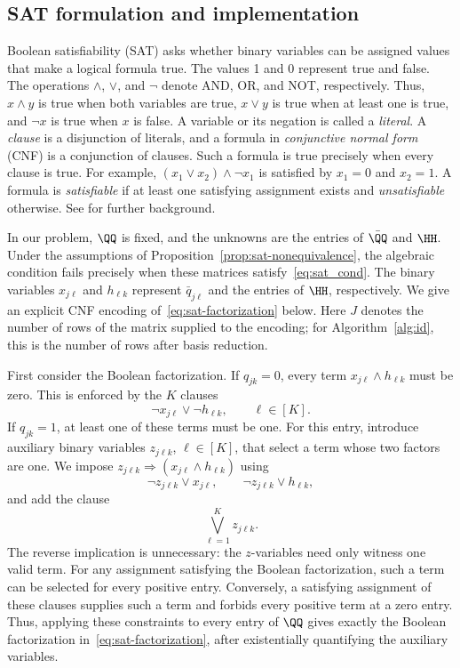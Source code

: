 \subsection{SAT formulation and implementation}
\label{app:sat-primer}

Boolean satisfiability (SAT) asks whether binary variables can be
assigned values that make a logical formula true. The values 1 and 0
represent true and false. The operations $\wedge$, $\vee$, and $\neg$
denote AND, OR, and NOT, respectively. Thus, $x\wedge y$ is true when
both variables are true, $x\vee y$ is true when at least one is true,
and $\neg x$ is true when $x$ is false. A variable or its negation is
called a \emph{literal}. A \emph{clause} is a disjunction of literals,
and a formula in \emph{conjunctive normal form} (CNF) is a conjunction
of clauses. Such a formula is true precisely when every clause is true.
For example, $(x_1\vee x_2)\wedge\neg x_1$ is satisfied by $x_1=0$
and $x_2=1$. A formula is \emph{satisfiable} if at least one satisfying
assignment exists and \emph{unsatisfiable} otherwise. See
\citet{biere2021handbook} for further background.

In our problem, $\QQ$ is fixed, and the unknowns are the entries of
$\bar{\QQ}$ and $\HH$. Under the assumptions of
Proposition~\ref{prop:sat-nonequivalence}, the algebraic condition
fails precisely when these matrices satisfy~\eqref{eq:sat_cond}.
The binary variables $x_{j\ell}$ and $h_{\ell k}$ represent
$\bar q_{j\ell}$ and the entries of $\HH$, respectively. We give an
explicit CNF encoding of~\eqref{eq:sat-factorization} below. Here $J$
denotes the number of rows of the matrix supplied to the encoding;
for Algorithm~\ref{alg:id}, this is the number of rows after basis
reduction.

First consider the Boolean factorization. If $q_{jk}=0$, every term
$x_{j\ell}\wedge h_{\ell k}$ must be zero. This is enforced by the
$K$ clauses
\begin{equation}\label{eq:supp-sat-zero}
\neg x_{j\ell}\vee\neg h_{\ell k},
\qquad \ell\in[K].
\end{equation}
If $q_{jk}=1$, at least one of these terms must be one. For this entry,
introduce auxiliary binary variables $z_{j\ell k}$, $\ell\in[K]$,
that select a term whose two factors are one. We impose
$z_{j\ell k}\Rightarrow(x_{j\ell}\wedge h_{\ell k})$ using
\begin{equation}\label{eq:supp-sat-and}
\neg z_{j\ell k}\vee x_{j\ell},
\qquad
\neg z_{j\ell k}\vee h_{\ell k},
\end{equation}
and add the clause
\begin{equation}\label{eq:supp-sat-positive}
\bigvee_{\ell=1}^K z_{j\ell k}.
\end{equation}
The reverse implication is unnecessary: the $z$-variables need only
witness one valid term. For any assignment satisfying the Boolean
factorization, such a term can be selected for every positive entry.
Conversely, a satisfying assignment of these clauses supplies such a
term and forbids every positive term at a zero entry. Thus, applying
these constraints to every entry of $\QQ$ gives exactly the Boolean
factorization in~\eqref{eq:sat-factorization}, after existentially
quantifying the auxiliary variables.

